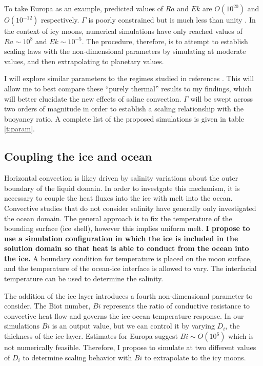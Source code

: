 \documentclass[12pt]{article}
\def\lb{\left(}
\def\rb{\right)}
\begin{document}
To take Europa as an example, predicted values of $Ra$ and  $Ek$ are $O\lb 10^{20}\rb $ and $O\lb 10^{-12}\rb $ respectively. $\Gamma$ is poorly constrained but is much less than unity \citep{yA21}. In the context of icy moons, numerical simulations have only reached values of $Ra \sim 10^{8}$ and $Ek \sim 10^{-5}$\citep{dL23}. 
The procedure, therefore, is to attempt to establish scaling laws with the non-dimensional parameters by simulating at moderate values, and then extrapolating to planetary values.

I will explore similar parameters to the regimes studied in references \citep{dL23,kS19}. This will allow me to best compare these ``purely thermal'' results to my findings, which will better elucidate the new effects of saline convection. $\Gamma$ will be swept across two orders of magnitude in order to establish a scaling relationship with the buoyancy ratio. A complete list of the proposed simulations is given in table \ref{t:param}. 
\subsection{Coupling the ice and ocean}

Horizontal convection is likey driven by salinity variations about the outer boundary of the liquid domain. In order to investgate this mechanism, it is necessary to couple the heat fluxes into the ice with melt into the ocean. 
Convective studies that do not consider salinity have generally only investigated the ocean domain\citep{kS19,dL23}. The general approach is to fix the temperature of the bounding surface (ice shell), however this implies uniform melt.
\textbf{I propose to use a simulation configuration in which the ice is included in the solution domain so that heat is able to conduct from the ocean into the ice.}
A boundary condition for temperature is placed on the moon surface, and the temperature of the ocean-ice interface is allowed to vary. The interfacial temperature can be used to determine the salinity\citep{wK22}.

The addition of the ice layer introduces a fourth non-dimensional parameter to consider. The Biot number, $Bi$\citep{jL24} represents the ratio of conductive resistance to convective heat flow and governs the ice-ocean temperature response. 
In our simulations $Bi$ is an output value, but we can control it by varying $D_{i}$, the thickness of the ice layer. Estimates for Europa suggest $Bi \sim O\lb 10^{6}\rb$\citep{dL23} which is not numerically feasible. Therefore, I propose to simulate at two different values of $D_{i}$ to determine scaling behavior with $Bi$ to extrapolate to the icy moons. 
\end{document}
